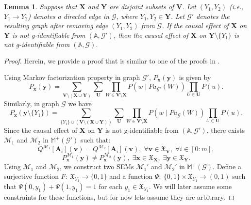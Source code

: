 \documentclass[accepted]{uai2022}
\newtheorem{lemma}{Lemma}
\newcommand{\Pa}[2]{\textit{Pa}_{#2}(#1)}
\newcommand{\V}[0]{\mathbf{V}}
\newcommand{\U}[0]{\mathbf{U}}
\newcommand{\X}[0]{\mathbf{X}}
\newcommand{\Y}[0]{\mathbf{Y}}
\newcommand{\A}[0]{\mathbf{A}}
\newcommand{\x}[0]{\mathbf{x}}
\newcommand{\y}[0]{\mathbf{y}}
\newcommand{\G}[0]{\mathcal{G}}
\newcommand{\M}[0]{\mathcal{M}}
\newcommand{\dom}[1]{\mathfrak{X}_{#1}}
\begin{document}
        \begin{lemma}\label{lemma: prp3 - 2}
            Suppose that $\X$ and $\Y$ are disjoint subsets of $\V$. Let $(Y_1,Y_2)$ (i.e., $Y_1\rightarrow Y_2$) denotes a directed edge in $\G$, where $Y_1,Y_2 \in \Y$. Let $\G'$ denotes the resulting graph after removing edge $(Y_1,Y_2)$ from $\G$. If the causal effect of $\X$ on $\Y$ is not g-identifiable from $(\mathbb{A}, \G')$, then the causal effect of $\X$ on $\Y \setminus \{Y_1\}$ is not g-identifiable from $(\mathbb{A}, \G)$.
        \end{lemma}
        \begin{proof}
            Herein, we provide a proof that is similar to one of the proofs in \citep{huang2008completeness}.
            
            Using Markov factorization property in graph $\G'$, $P_{\mathbf{x}}(\mathbf{y})$ is given by
            \begin{equation*}
                P_{\x}(\y) = 
                \sum_{\V\setminus(\X\cup \Y)} \sum_{\U} \prod_{W \in \V\setminus \X}P(w \mid \Pa{W}{\G'}) \prod_{U \in \U} P(u).
            \end{equation*}
            Similarly, in graph $\G$ we have
            \begin{equation*}
                P_{\x}(\y \setminus\{Y_1\}) = 
                \sum_{\{Y_1\} \cup (\V \setminus (\X \cup \Y))} \sum_{\U} \prod_{W \in \V \setminus \X} P(w \mid \Pa{W}{\G}) \prod_{U \in \U} P(u).
            \end{equation*}
            Since the causal effect of $\X$ on $\Y$ is not g-identifiable from $(\mathbb{A}, \G')$, there exists $\M_1$ and $\M_2$ in $\mathbb{M}^+(\G')$ such that:
            \begin{equation*}
                Q^{\M_1}[\A_i](\mathbf{v}) = Q^{\M_2}[\A_i](\mathbf{v}),\; \forall \mathbf{v}\in \dom{\V},\; \forall i \in [0: m],
            \end{equation*}
            \begin{equation*}
                P_{\x}^{\M_1}(\y)\neq P_{\x}^{\M_2}(\y),\; \exists \x \in \dom{\X}, \; \exists \y \in \dom{\Y}.
            \end{equation*}
            Using $\M_1$ and $\M_2$, we construct two SEMs $\M_1'$ and $\M_2'$ in $\mathbb{M}^+(\G)$. 
            Define a surjective function $F\!:\: \dom{Y_1}\rightarrow \{0, 1\}$ and a function $\Psi \!:\: \{0, 1\}\times \dom{Y_1} \rightarrow (0,1)$ such that $\Psi(0, y_1)+\Psi(1, y_1)=1$ for each $y_1 \in \dom{Y_1}$.
            We will later assume some constraints for these functions, but for now lets assume they are arbitrary. 
            

\end{proof}
\end{document}
